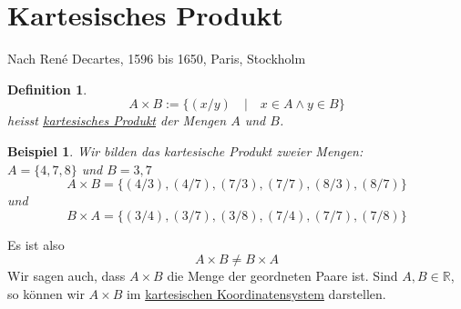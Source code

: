 \documentclass{report}
\newtheorem{mydef}{Definition}
\newtheorem{myexample}{Beispiel}
\begin{document}
\section{Kartesisches Produkt}
Nach René Decartes, 1596 bis 1650, Paris, Stockholm
\begin{mydef}\begin{equation}A \times B := \{(x/y) \quad | \quad x \in A \land y \in B\}\end{equation}heisst \underline{kartesisches Produkt} der Mengen $A$ und $B$.\end{mydef}
\begin{myexample}Wir bilden das kartesische Produkt zweier Mengen:\\
$A = \{4, 7, 8\}$ und $B = {3, 7}$
\begin{equation}A \times B = \{(4/3), (4/7), (7/3), (7/7), (8/3), (8/7)\}\end{equation}
und
\begin{equation}B \times A = \{(3/4), (3/7), (3/8), (7/4), (7/7), (7/8)\}\end{equation}
\end{myexample}Es ist also
\begin{equation}A \times B \neq B \times A\end{equation}
Wir sagen auch, dass $A \times B$ die Menge der geordneten Paare ist. Sind $A, B \in \mathbb{R}$, so können wir $A \times B$ im \underline{kartesischen Koordinatensystem} darstellen.
\end{document}
